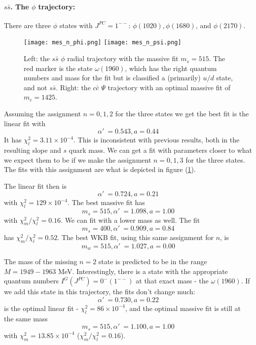 \documentclass[11pt,a4]{article}
\newcommand{\alp}{\ensuremath{\alpha'\:}}
\newcommand{\ssb}{s\bar{s}}
\newcommand{\ccb}{c\bar{c}}
\newcommand{\rchi}[1]{\ensuremath{\chi^2_m/\chi^2_l = #1}}
\newcommand{\ten}[1]{\times10^{#1}}
\begin{document}
				\paragraph{\(\ssb\). The \(\phi\) trajectory:} There are three \(\phi\) states with \(J^{PC} = 1^{--}\): \(\phi(1020), \phi(1680)\), and \(\phi(2170)\).
				
				\begin{figure}[tbp] \centering
						\texttt{[image: mes\_n\_phi.png]}	 \hfill
						\texttt{[image: mes\_n\_psi.png]}
						\caption{\label{fig:phi_psi} Left: the \(\ssb\) \(\phi\) radial trajectory with the massive fit \(m_s = 515\). The red marker is the state \(\omega(1960)\), which has the right quantum numbers and mass for the fit but is classified a (primarily) \(u/d\) state, and not \(\ssb\). Right: the \(\ccb\) \(\Psi\) trajectory with an optimal massive fit of \(m_c = 1425\).}
				\end{figure}
				
				Assuming the assignment \(n = 0, 1, 2\) for the three states we get the best fit is the linear fit with
				\[ \alp = 0.543, a = 0.44 \]
				It has \(\chi^2_l = 3.11\ten{-4}\). This is inconsistent with previous results, both in the resulting slope and \(s\) quark mass. We can get a fit with parameters closer to what we expect them to be if we make the assignment \(n = 0,1,3\) for the three states. The fits with this assignment are what is depicted in figure (\ref{fig:phi_psi}).
				
				The linear fit then is
				\[ \alp = 0.724, a = 0.21 \]
				with \(\chi^2_l = 129\ten{-4}\). The best massive fit has
				\[ m_s = 515, \alp = 1.098, a = 1.00 \]
				with \rchi{0.16}. We can fit with a lower mass as well. The fit
				\[ m_s = 400, \alp = 0.909, a = 0.84 \]
				has \rchi{0.52}. The best WKB fit, using this same assignment for \(n\), is
				\[ m_w = 515, \alp = 1.027, a = 0.00 \]
				
				The mass of the missing \(n = 2\) state is predicted to be in the range \(M = 1949-1963\) MeV. Interestingly, there is a state with the appropriate quantum numbers \(I^G(J^{PC}) = 0^-(1^{--})\) at that exact mass - the \(\omega(1960)\). If we add this state in this trajectory, the fits don't change much:
				\[ \alp = 0.730, a = 0.22 \]
				is the optimal linear fit - \(\chi^2_l = 86\ten{-4}\), and the optimal massive fit is still at the same mass
				\[ m_s = 515, \alp = 1.100, a = 1.00 \]
				with \(\chi^2_m = 13.85\ten{-4}\) (\rchi{0.16}).
				
\end{document}
